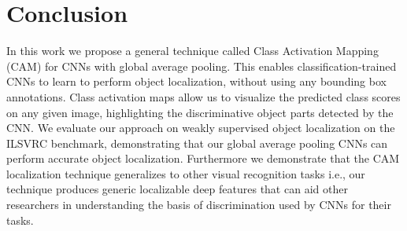 \documentclass[10pt,twocolumn,letterpaper]{article}
\begin{document}
\section{Conclusion}



In this work we propose a general technique called Class Activation Mapping (CAM) for CNNs with global average pooling. This enables classification-trained CNNs to learn to perform object localization, without using any bounding box annotations. Class activation maps allow us to visualize the predicted class scores on any given image, highlighting the discriminative object parts detected by the CNN. We evaluate our approach on weakly supervised object localization on the ILSVRC benchmark, demonstrating that our global average pooling CNNs can perform accurate object localization. Furthermore we demonstrate that the CAM localization technique generalizes to other visual recognition tasks i.e., our technique produces generic localizable deep features that can aid other researchers in understanding the basis of discrimination used by CNNs for their tasks.

{\small


}
\end{document}
